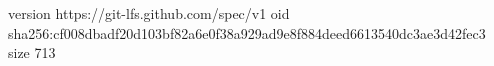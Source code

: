 version https://git-lfs.github.com/spec/v1
oid sha256:cf008dbadf20d103bf82a6e0f38a929ad9e8f884deed6613540dc3ae3d42fec3
size 713
